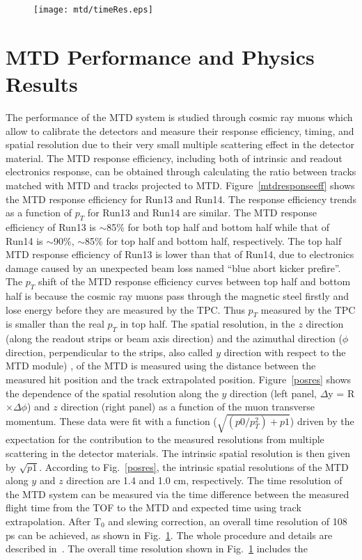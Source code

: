 \begin{figure}[htbp]
\centering
\texttt{[image: mtd/timeRes.eps]}
 \label{timeRes}
\end{figure}

\section{MTD Performance and Physics Results}
The performance of the MTD system is studied through cosmic ray muons which allow to calibrate the detectors and measure their response efficiency, timing, and spatial resolution due to their very small multiple scattering effect in the detector material. The MTD response efficiency, including both of intrinsic and readout electronics response, can be obtained through calculating the ratio between tracks matched with MTD and tracks projected to MTD. Figure~\ref{mtdresponseeff} shows the MTD response efficiency for Run13 and Run14. The response efficiency trends as a function of $p_{T}$ for Run13 and Run14 are similar. The MTD response efficiency of Run13 is $\sim$85\% for both top half and bottom half while that of Run14 is $\sim$90\%, $\sim$85\% for top half and bottom half, respectively. The top half MTD response efficiency of Run13 is lower than that of Run14, due to electronics damage caused by an unexpected beam loss named ``blue abort kicker prefire''. The $p_{T}$ shift of the MTD response efficiency curves between top half and bottom half is because the cosmic ray muons pass through the magnetic steel firstly and lose energy before they are measured by the TPC. Thus $p_{T}$ measured by the TPC is smaller than the real $p_{T}$ in top half. The spatial resolution, in the $z$ direction (along the readout strips or beam axis direction) and the azimuthal direction ($\phi$ direction, perpendicular to the strips, also called $y$ direction with respect to the MTD module) , of the MTD is measured using the distance between the measured hit position and the track extrapolated position. Figure~\ref{posres} shows the dependence of the spatial resolution along the $y$ direction (left panel, $\Delta$y = R$\times$$\Delta\phi$) and $z$ direction (right panel) as a function of the muon transverse momentum. These data were fit with a function ($\sqrt{(p0/p_{T}^{2}) + p1}$) driven by the expectation for the contribution to the measured resolutions from multiple scattering in the detector materials. The intrinsic spatial resolution is then given by $\sqrt{p1}$. According to Fig.~\ref{posres}, the intrinsic spatial resolutions of the MTD along $y$ and $z$ direction are 1.4 and 1.0 cm, respectively. The time resolution of the MTD system can be measured via the time difference between the measured flight time from the TOF to the MTD and expected time using track extrapolation. After T$_{0}$ and slewing correction, an overall time resolution of 108 ps can be achieved, as shown in Fig.~\ref{timeRes}. The whole procedure and details are described in~\cite{MTDcalib}. The overall time resolution shown in Fig.~\ref{timeRes} includes the 